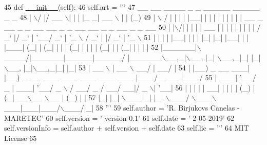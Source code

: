 \begin{DoxyCode}
45     \textcolor{keyword}{def }\mbox{\hyperlink{classxml_writer_1_1xml_writer_a0b43f6115153b244e10d1933ee33500a}{\_\_init\_\_}}(self):
46         self.art = \textcolor{stringliteral}{'''}
47 \textcolor{stringliteral}{  \_\_  \_\_  \_\_\_\_  \_    \_ \_\_\_\_\_ \_\_\_\_\_    \_                                       \_             }
48 \textcolor{stringliteral}{ |  \(\backslash\)/  |/ \_\_ \(\backslash\)| |  | |\_   \_|  \_\_ \(\backslash\)  | |                                     (\_)            }
49 \textcolor{stringliteral}{ | \(\backslash\)  / | |  | | |\_\_| | | | | |  | | | |     \_\_ \_  \_\_ \_ \_ \_\_ \_\_ \_ \_ \_\_   \_\_ \_ \_  \_\_ \_ \_ \_\_  }
50 \textcolor{stringliteral}{ | |\(\backslash\)/| | |  | |  \_\_  | | | | |  | | | |    / \_` |/ \_` | '\_\_/ \_` | '\_ \(\backslash\) / \_` | |/ \_` | '\_ \(\backslash\) }
51 \textcolor{stringliteral}{ | |  | | |\_\_| | |  | |\_| |\_| |\_\_| | | |\_\_\_| (\_| | (\_| | | | (\_| | | | | (\_| | | (\_| | | | |}
52 \textcolor{stringliteral}{ |\_\_\_\_\_\_|\(\backslash\)\_\_\_\_/|\_\_\_\_\_\_|\_\_\_\_\_|\_\_\_\_\_/  |\_\_\_\_\_\_\(\backslash\)\_\_,\_|\(\backslash\)\_\_, |\_|  \(\backslash\)\_\_,\_|\_| |\_|\(\backslash\)\_\_, |\_|\(\backslash\)\_\_,\_|\_| |\_|}
53 \textcolor{stringliteral}{ |  \_\_ \(\backslash\)        |  \_\_ \(\backslash\)                            \_\_/ |                 \_\_/ |              }
54 \textcolor{stringliteral}{ | |\_\_) \_ \_\_ \_\_\_| |\_\_) \_ \_\_ \_\_\_   \_\_\_ \_\_\_ \_\_\_ \_\_\_ |\_\_\_/ \_ \_\_            |\_\_\_/               }
55 \textcolor{stringliteral}{ |  \_\_\_| '\_\_/ \_ |  \_\_\_| '\_\_/ \_ \(\backslash\) / \_\_/ \_ / \_\_/ \_\_|/ \_ \(\backslash\)| '\_\_|                               }
56 \textcolor{stringliteral}{ | |   | | |  \_\_| |   | | | (\_) | (\_|  \_\_\(\backslash\)\_\_ \(\backslash\)\_\_ | (\_) | |                                  }
57 \textcolor{stringliteral}{ |\_|   |\_|  \(\backslash\)\_\_\_|\_|   |\_|  \(\backslash\)\_\_\_/ \(\backslash\)\_\_\_\(\backslash\)\_\_\_|\_\_\_|\_\_\_/\(\backslash\)\_\_\_/|\_|                                  }
58 \textcolor{stringliteral}{'''}
59         self.author = \textcolor{stringliteral}{'R. Birjukovs Canelas - MARETEC'}
60         self.version = \textcolor{stringliteral}{' version 0.1'}
61         self.date = \textcolor{stringliteral}{' 2-05-2019'}
62         self.versionInfo = self.author + self.version + self.date
63         self.lic = \textcolor{stringliteral}{'''}
64 \textcolor{stringliteral}{    MIT License}
65 \textcolor{stringliteral}{    }

\end{DoxyCode}
